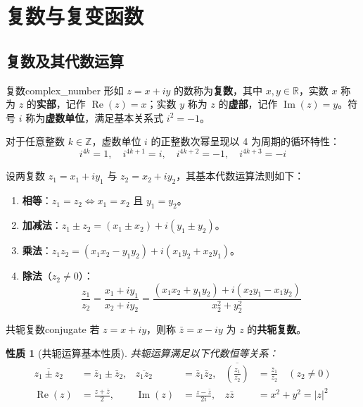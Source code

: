 \documentclass[11pt,a4paper,fontset=fandol]{ctexart}
\newtheorem{property}[theorem]{性质}
\theoremstyle{remark}
\begin{document}
\section{复数与复变函数}

\subsection{复数及其代数运算}

\begin{definition}{复数}{complex_number}
形如 $z = x + iy$ 的数称为\textbf{复数}，其中 $x, y \in \mathbb{R}$，实数 $x$ 称为 $z$ 的\textbf{实部}，记作 $\operatorname{Re}(z) = x$；实数 $y$ 称为 $z$ 的\textbf{虚部}，记作 $\operatorname{Im}(z) = y$。符号 $i$ 称为\textbf{虚数单位}，满足基本关系式 $i^2 = -1$。
\end{definition}

对于任意整数 $k \in \mathbb{Z}$，虚数单位 $i$ 的正整数次幂呈现以 4 为周期的循环特性：
\begin{equation}
    i^{4k} = 1,\quad i^{4k+1} = i,\quad i^{4k+2} = -1,\quad i^{4k+3} = -i
\end{equation}

设两复数 $z_1 = x_1 + iy_1$ 与 $z_2 = x_2 + iy_2$，其基本代数运算法则如下：
\begin{enumerate}
    \item \textbf{相等}：$z_1 = z_2 \iff x_1 = x_2$ 且 $y_1 = y_2$。
    \item \textbf{加减法}：$z_1 \pm z_2 = (x_1 \pm x_2) + i(y_1 \pm y_2)$。
    \item \textbf{乘法}：$z_1 z_2 = (x_1 x_2 - y_1 y_2) + i(x_1 y_2 + x_2 y_1)$。
    \item \textbf{除法}（$z_2 \neq 0$）：
    \begin{equation}
        \frac{z_1}{z_2} = \frac{x_1 + iy_1}{x_2 + iy_2} = \frac{(x_1 x_2 + y_1 y_2) + i(x_2 y_1 - x_1 y_2)}{x_2^2 + y_2^2}
    \end{equation}
\end{enumerate}

\begin{definition}{共轭复数}{conjugate}
若 $z = x + iy$，则称 $\bar{z} = x - iy$ 为 $z$ 的\textbf{共轭复数}。
\end{definition}

\begin{property}[共轭运算基本性质]
共轭运算满足以下代数恒等关系：
\begin{align}
    \overline{z_1 \pm z_2} &= \bar{z}_1 \pm \bar{z}_2, &
    \overline{z_1 z_2} &= \bar{z}_1 \bar{z}_2, &
    \overline{\left(\frac{z_1}{z_2}\right)} &= \frac{\bar{z}_1}{\bar{z}_2} \quad (z_2 \neq 0) \\
    \operatorname{Re}(z) &= \frac{z + \bar{z}}{2}, &
    \operatorname{Im}(z) &= \frac{z - \bar{z}}{2i}, &
    z \bar{z} &= x^2 + y^2 = |z|^2
\end{align}
\end{property}
\end{document}

